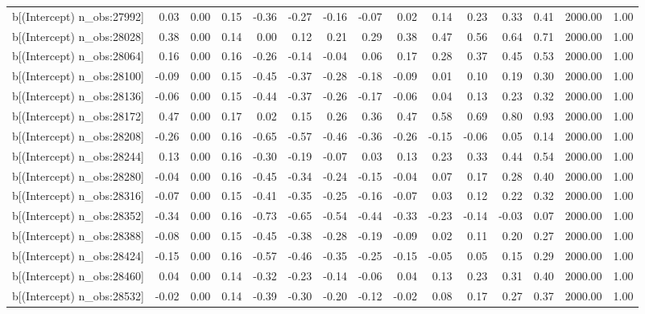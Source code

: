 \begin{table}[ht]
\begin{tabular}{rrrrrrrrrrrrrrr}
  b[(Intercept) n\_obs:27992] & 0.03 & 0.00 & 0.15 & -0.36 & -0.27 & -0.16 & -0.07 & 0.02 & 0.14 & 0.23 & 0.33 & 0.41 & 2000.00 & 1.00 \\ 
  b[(Intercept) n\_obs:28028] & 0.38 & 0.00 & 0.14 & 0.00 & 0.12 & 0.21 & 0.29 & 0.38 & 0.47 & 0.56 & 0.64 & 0.71 & 2000.00 & 1.00 \\ 
  b[(Intercept) n\_obs:28064] & 0.16 & 0.00 & 0.16 & -0.26 & -0.14 & -0.04 & 0.06 & 0.17 & 0.28 & 0.37 & 0.45 & 0.53 & 2000.00 & 1.00 \\ 
  b[(Intercept) n\_obs:28100] & -0.09 & 0.00 & 0.15 & -0.45 & -0.37 & -0.28 & -0.18 & -0.09 & 0.01 & 0.10 & 0.19 & 0.30 & 2000.00 & 1.00 \\ 
  b[(Intercept) n\_obs:28136] & -0.06 & 0.00 & 0.15 & -0.44 & -0.37 & -0.26 & -0.17 & -0.06 & 0.04 & 0.13 & 0.23 & 0.32 & 2000.00 & 1.00 \\ 
  b[(Intercept) n\_obs:28172] & 0.47 & 0.00 & 0.17 & 0.02 & 0.15 & 0.26 & 0.36 & 0.47 & 0.58 & 0.69 & 0.80 & 0.93 & 2000.00 & 1.00 \\ 
  b[(Intercept) n\_obs:28208] & -0.26 & 0.00 & 0.16 & -0.65 & -0.57 & -0.46 & -0.36 & -0.26 & -0.15 & -0.06 & 0.05 & 0.14 & 2000.00 & 1.00 \\ 
  b[(Intercept) n\_obs:28244] & 0.13 & 0.00 & 0.16 & -0.30 & -0.19 & -0.07 & 0.03 & 0.13 & 0.23 & 0.33 & 0.44 & 0.54 & 2000.00 & 1.00 \\ 
  b[(Intercept) n\_obs:28280] & -0.04 & 0.00 & 0.16 & -0.45 & -0.34 & -0.24 & -0.15 & -0.04 & 0.07 & 0.17 & 0.28 & 0.40 & 2000.00 & 1.00 \\ 
  b[(Intercept) n\_obs:28316] & -0.07 & 0.00 & 0.15 & -0.41 & -0.35 & -0.25 & -0.16 & -0.07 & 0.03 & 0.12 & 0.22 & 0.32 & 2000.00 & 1.00 \\ 
  b[(Intercept) n\_obs:28352] & -0.34 & 0.00 & 0.16 & -0.73 & -0.65 & -0.54 & -0.44 & -0.33 & -0.23 & -0.14 & -0.03 & 0.07 & 2000.00 & 1.00 \\ 
  b[(Intercept) n\_obs:28388] & -0.08 & 0.00 & 0.15 & -0.45 & -0.38 & -0.28 & -0.19 & -0.09 & 0.02 & 0.11 & 0.20 & 0.27 & 2000.00 & 1.00 \\ 
  b[(Intercept) n\_obs:28424] & -0.15 & 0.00 & 0.16 & -0.57 & -0.46 & -0.35 & -0.25 & -0.15 & -0.05 & 0.05 & 0.15 & 0.29 & 2000.00 & 1.00 \\ 
  b[(Intercept) n\_obs:28460] & 0.04 & 0.00 & 0.14 & -0.32 & -0.23 & -0.14 & -0.06 & 0.04 & 0.13 & 0.23 & 0.31 & 0.40 & 2000.00 & 1.00 \\ 
  b[(Intercept) n\_obs:28532] & -0.02 & 0.00 & 0.14 & -0.39 & -0.30 & -0.20 & -0.12 & -0.02 & 0.08 & 0.17 & 0.27 & 0.37 & 2000.00 & 1.00 \\ 

\end{tabular}
\end{table}
